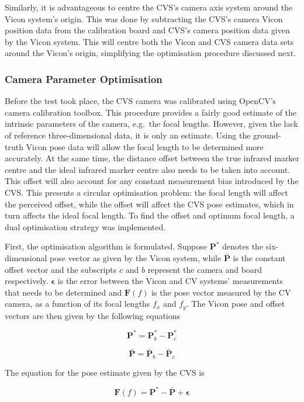 Similarly, it is advantageous to centre the CVS's camera axis system around the Vicon system's origin. This was done by subtracting the CVS's camera Vicon position data from the calibration board and CVS's camera position data given by the Vicon system. This will centre both the Vicon and CVS camera data sets around the Vicon's origin, simplifying the optimisation procedure discussed next. 

\subsubsection{Camera Parameter Optimisation}
\label{sec:focal-optimisation}

Before the test took place, the CVS camera was calibrated using OpenCV's camera calibration toolbox. This procedure provides a fairly good estimate of the intrinsic parameters of the camera, e.g.\ the focal lengths. However, given the lack of reference three-dimensional data, it is only an estimate. Using the ground-truth Vicon pose data will allow the focal length to be determined more accurately. At the same time, the distance offset between the true infrared marker centre and the ideal infrared marker centre also needs to be taken into account. This offset will also account for any constant measurement bias introduced by the CVS\@. This presents a circular optimisation problem: the focal length will affect the perceived offset, while the offset will affect the CVS pose estimates, which in turn affects the ideal focal length. To find the offset and optimum focal length, a dual optimisation strategy was implemented.  

First, the optimisation algorithm is formulated. Suppose $\bm{P}^*$ denotes the six-dimensional pose vector as given by the Vicon system, while $\bar{\bm{P}}$ is the constant offset vector and the subscripts $c$ and $b$ represent the camera and board respectively. $\bm{\epsilon}$ is the error between the Vicon and CV systems' measurements that needs to be determined and $\bm{F}(f)$ is the pose vector measured by the CV camera, as a function of its focal lengths $f_x$ and $f_y$. The Vicon pose and offset vectors are then given by the following equations

\[
  \bm{P}^* = \bm{P}^*_b - \bm{P}^*_c
\]

\[
  \bar{\bm{P}} = \bar{\bm{P}}_b - \bar{\bm{P}}_c
\]

The equation for the pose estimate given by the CVS is 

\[
  \bm{F}(f) = \bm{P}^* - \bar{\bm{P}} + \bm{\epsilon}
\]

